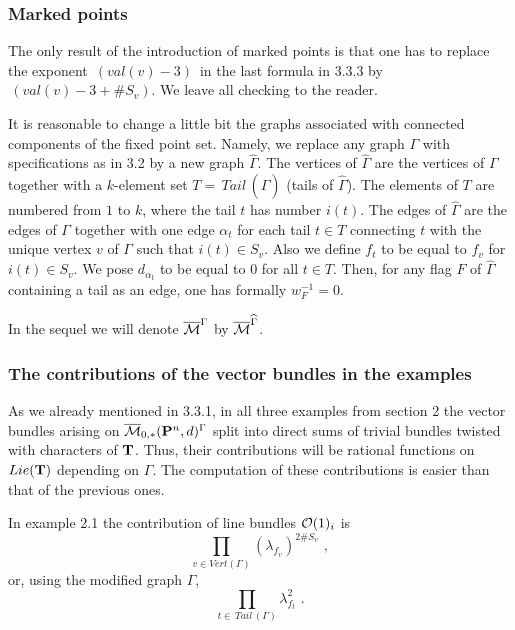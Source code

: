 \documentclass{amsart}
\begin{document}
\subsubsection{Marked points}

The only result of the introduction  of marked points is that one has to
replace the exponent $\,(val(v)-3)\,$ in the last  formula in 3.3.3
 by $\,(val(v)-3+\# S_v)$.
  We leave all checking to the reader.

It is reasonable to change a little bit the graphs associated with
 connected components of the fixed point set.
  Namely, we replace any graph $\Gamma$ with specifications as in 3.2 by a  new
graph $\widehat\Gamma$. The vertices of $\widehat\Gamma$
 are the vertices of $\Gamma$ together with a $k$-element set
$T=\,Tail\,(\widehat\Gamma)$ (tails  of $\widehat\Gamma$). The elements of $T$
are numbered from $1$ to $k$, where the tail $t$ has number $i(t)$. The edges
of $\widehat\Gamma$ are the edges of $\Gamma$ together
 with one edge $\alpha_t$ for each tail $t\in T$ connecting $t$ with the unique
vertex $v$ of $\Gamma$ such that $i(t)\in S_v$. Also we define
 $f_t$ to be equal to $f_v$ for $i(t)\in S_v$.
 We pose $d_{\alpha_t}$ to be equal to $0$ for all $t\in T$. Then,  for any
flag $F$ of $\widehat\Gamma$ containing a tail as an edge,
  one has formally $w_F^{-1}=0$.

In the sequel we will denote $\overline{\mathcal{M}}^{\Gamma}$ by $\overline{\mathcal{M}}^{\widehat\Gamma}$.



\subsubsection{The contributions of the vector bundles in the examples}

As we already mentioned in 3.3.1, in all three examples from  section 2 the
vector bundles arising on $\overline{\mathcal{M}}_{0,*}(\mathbf P^n,d)^{\Gamma}$
 split into direct sums of trivial bundles twisted with characters of $\mathbf T$.
Thus, their contributions will be  rational functions on $Lie(\mathbf T)$ depending on
$\Gamma$. The computation of these contributions is easier than that of the
previous ones.

In  example 2.1 the contribution of line bundles $\mathcal O(1)_i$ is
$$\prod_{v\in Vert(\Gamma)}(\lambda_{f_v})^{2\# S_v}\,\,,$$
or, using the modified graph $\widehat\Gamma$,
$$\prod_{t\in \,Tail\,(\Gamma)}\lambda^2_{f_t}\,\,.$$
\end{document}
